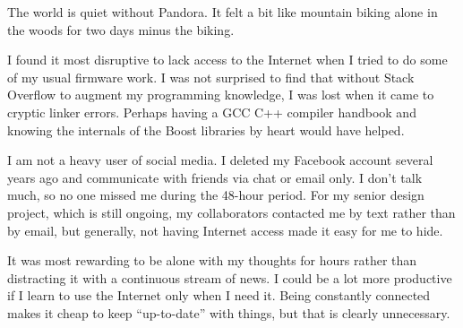 \documentclass[12pt,letterpaper]{article}
\begin{document}
The world is quiet without Pandora. It felt a bit like mountain biking alone in
the woods for two days minus the biking.

I found it most disruptive to lack access to the Internet when I tried to do
some of my usual firmware work. I was not surprised to find that without Stack
Overflow to augment my programming knowledge, I was lost when it came to
cryptic linker errors. Perhaps having a GCC C++ compiler handbook and knowing
the internals of the Boost libraries by heart would have helped.

I am not a heavy user of social media. I deleted my Facebook account several
years ago and communicate with friends via chat or email only. I don't talk
much, so no one missed me during the 48-hour period. For my senior design
project, which is still ongoing, my collaborators contacted me by text rather
than by email, but generally, not having Internet access made it easy for me to
hide.

It was most rewarding to be alone with my thoughts for hours rather than
distracting it with a continuous stream of news. I could be a lot more
productive if I learn to use the Internet only when I need it. Being constantly
connected makes it cheap to keep ``up-to-date'' with things, but that is
clearly unnecessary.
\end{document}
